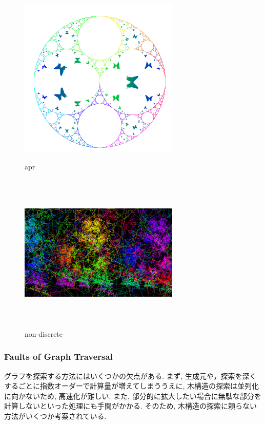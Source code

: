 \begin{figure}[htbp]
 \begin{minipage}{0.49\hsize}
  \begin{center}
   \includegraphics[width=3in, height=3in, keepaspectratio]{../img/klein/apr.pdf}
   \caption{apr}
   \label{fig:apr}
  \end{center}
 \end{minipage}
 \begin{minipage}{0.49\hsize}
  \begin{center}
   \includegraphics[width=3in, height=3in, keepaspectratio]{../img/klein/non-discrete.pdf}
   \caption{non-discrete}
   \label{fig:non-discrete}
  \end{center}
 \end{minipage}
\end{figure}

\subsubsection{Faults of Graph Traversal}

グラフを探索する方法にはいくつかの欠点がある. まず, 生成元や，探索を深くするごとに指数オーダーで計算量が増えてしまううえに, 木構造の探索は並列化に向かないため, 高速化が難しい. また, 部分的に拡大したい場合に無駄な部分を計算しないといった処理にも手間がかかる. そのため, 木構造の探索に頼らない方法がいくつか考案されている.

